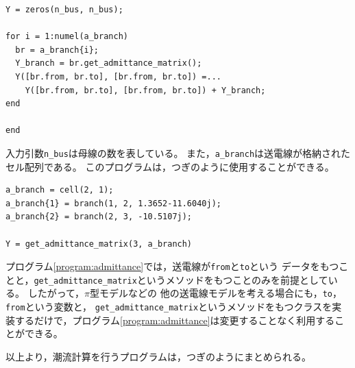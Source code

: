 \documentclass[tombow,dvipdfmx]{corona-a5-1.1}
\begin{document}
\begin{例}[オブジェクト指向によるアドミタンス行列の計算]
\begin{PROGRAMA}[count,title={get\_admittance\_matrix.m}]
\begin{verbatim}
Y = zeros(n_bus, n_bus);

for i = 1:numel(a_branch)
  br = a_branch{i};
  Y_branch = br.get_admittance_matrix();
  Y([br.from, br.to], [br.from, br.to]) =...
    Y([br.from, br.to], [br.from, br.to]) + Y_branch;
end

end
\end{verbatim}
\end{PROGRAMA}

入力引数\verb|n_bus|は母線の数を表している。
また，\verb|a_branch|は送電線が格納されたセル配列である。
このプログラムは，つぎのように使用することができる。

\smallskip
\begin{PROGRAMA}[count,title={main\_admittance\_matrix.m}]\label{program:main_admittance}
\begin{verbatim}
a_branch = cell(2, 1);
a_branch{1} = branch(1, 2, 1.3652-11.6040j);
a_branch{2} = branch(2, 3, -10.5107j);

Y = get_admittance_matrix(3, a_branch)
\end{verbatim}
\end{PROGRAMA}


プログラム\nobreak\ref{program:admittance}では，送電線が\verb|from|と\verb|to|という
データをもつことと，\verb|get_admittance_matrix|というメソッドをもつことのみを前提としている。
したがって，$\pi$型モデルなどの
他の送電線モデルを考える場合にも，\verb|to|，\verb|from|という変数と，
\verb|get_admittance_matrix|というメソッドをもつクラスを実装するだけで，プログラム\nobreak\ref{program:admittance}は変更することなく利用することができる。
\end{例}

以上より，潮流計算を行うプログラムは，つぎのようにまとめられる。
\end{document}
